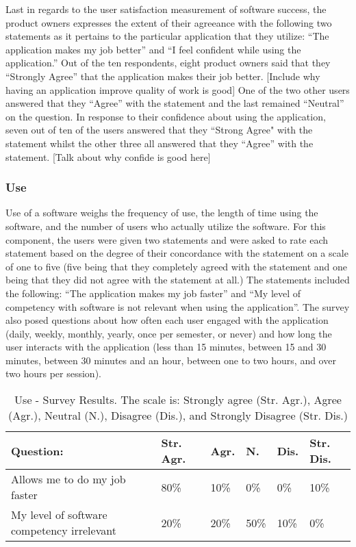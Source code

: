 Last in regards to the user satisfaction measurement of software success, the product owners expresses the extent of their agreeance with the following two statements as it pertains to the particular application that they utilize: ``The application makes my job better'' and ``I feel confident while using the application.'' Out of the ten respondents, eight product owners said that they ``Strongly Agree'' that the application makes their job better. [Include why having an application improve quality of work is good] One of the two other users answered that they ``Agree'' with the statement and the last remained ``Neutral'' on the question. In response to their confidence about using the application, seven out of ten of the users answered that they ``Strong Agree" with the statement whilst the other three all answered that they ``Agree'' with the statement. [Talk about why confide is good here]

 \subsubsection{Use}
Use of a software weighs the frequency of use, the length of time using the software, and the number of users who actually utilize the software. For this component, the users were given two statements and were asked to rate each statement based on the degree of  their concordance with the statement on a scale of one to five (five being that they completely agreed with the statement and one being that they did not agree with the statement at all.) The statements included the following: ``The application makes my job faster'' and ``My level of competency with software is not relevant when using the application''. The survey also posed questions about how often each user engaged with the application (daily, weekly, monthly, yearly, once per semester, or never)  and how long the user interacts with the application (less than 15 minutes, between 15 and 30 minutes, between 30 minutes and an hour, between one to two hours, and over two hours per session).

\begin{table}
\caption{Use - Survey Results. The scale is: Strongly agree (Str. Agr.), Agree (Agr.), Neutral (N.), Disagree (Dis.), and Strongly Disagree (Str. Dis.)}
\label{table:usersatisfaction}
\begin{tabular}{p{2.6cm}p{.75cm}p{.75cm}p{.75cm}p{.75cm}p{.75cm}}
Question: & Str. Agr. & Agr. & N. & Dis. & Str. Dis. \\
 \hline
Allows me to do my job faster & 80\% & 10\% & 0\% & 0\% & 10\% \\
My level of software competency irrelevant & 20\% & 20\% & 50\% & 10\% & 0\% \\
\end{tabular}
\end{table}

